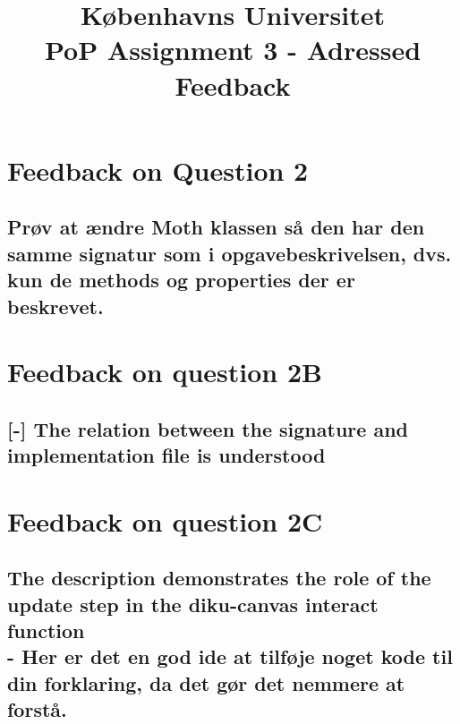 \documentclass[a4paper,12pt]{article}
\begin{document}
% 

\title{Københavns Universitet\\
PoP Assignment 3 - Adressed Feedback}
\maketitle %

\section{Feedback on Question 2}

\subsection{Prøv at ændre Moth klassen så den har den samme signatur som i opgavebeskrivelsen, dvs. kun de
methods og properties der er beskrevet.}

\section{Feedback on question 2B}

\subsection{[-] The relation between the signature and implementation file is understood}

\section{Feedback on question 2C}

\subsection{The description demonstrates the role of the update step in the diku-canvas interact function\\ 
- Her er det en god ide at tilføje noget kode til din forklaring, da det gør det nemmere at forstå.}
\end{document}
